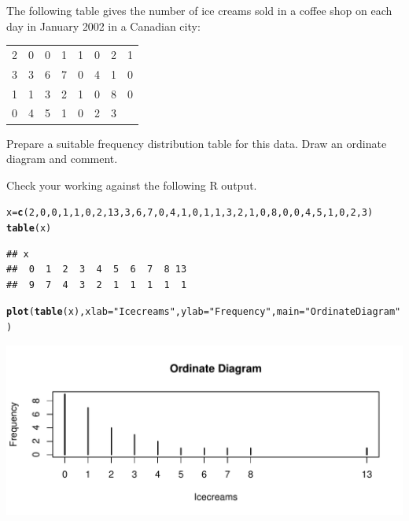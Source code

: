 \documentclass[bigtut]{tutorial}\usepackage[]{graphicx}\usepackage[]{color}
\makeatletter
\def\maxwidth{ %
  \ifdim\Gin@nat@width>\linewidth
    \linewidth
  \else
    \Gin@nat@width
  \fi
}
\newcommand{\hlnum}[1]{\textcolor[rgb]{0.686,0.059,0.569}{#1}}%
\newcommand{\hlstr}[1]{\textcolor[rgb]{0.192,0.494,0.8}{#1}}%
\newcommand{\hlstd}[1]{\textcolor[rgb]{0.345,0.345,0.345}{#1}}%
\newcommand{\hlkwb}[1]{\textcolor[rgb]{0.69,0.353,0.396}{#1}}%
\newcommand{\hlkwc}[1]{\textcolor[rgb]{0.333,0.667,0.333}{#1}}%
\newcommand{\hlkwd}[1]{\textcolor[rgb]{0.737,0.353,0.396}{\textbf{#1}}}%
\newenvironment{kframe}{%
 \def\at@end@of@kframe{}%
 \ifinner\ifhmode%
  \def\at@end@of@kframe{\end{minipage}}%
  \begin{minipage}{\columnwidth}%
 \fi\fi%
 \def\FrameCommand##1{\hskip\@totalleftmargin \hskip-\fboxsep
 \colorbox{shadecolor}{##1}\hskip-\fboxsep
     \hskip-\linewidth \hskip-\@totalleftmargin \hskip\columnwidth}%
 \MakeFramed {\advance\hsize-\width
   \@totalleftmargin\z@ \linewidth\hsize
   \@setminipage}}%
 {\par\unskip\endMakeFramed%
 \at@end@of@kframe}
\newenvironment{knitrout}{}{} %
\makeatother
\begin{document}
\begin{tutorial}
\begin{questions}
The following table gives the number of ice creams sold in a coffee shop
on each day in January 2002 in a Canadian city:
\begin{center}
 \begin{tabular}{llllllll}
   2&0&0&1&1&0&2&1\\
 3&3&6&7&0&4&1&0\\
1&1&3&2&1&0&8&0\\
  0&4&5&1&0&2&3&
 \end{tabular}
\end{center}

Prepare a suitable frequency distribution table for this data. Draw an ordinate
diagram and comment.


\begin{solution}

Check your working against the following R output.
\begin{knitrout}
\color{fgcolor}\begin{kframe}
\begin{alltt}
\hlstd{x}\hlkwb{=}\hlkwd{c}\hlstd{(}\hlnum{2}\hlstd{,}\hlnum{0}\hlstd{,}\hlnum{0}\hlstd{,}\hlnum{1}\hlstd{,}\hlnum{1}\hlstd{,}\hlnum{0}\hlstd{,}\hlnum{2}\hlstd{,}\hlnum{13}\hlstd{,}\hlnum{3}\hlstd{,}\hlnum{6}\hlstd{,}\hlnum{7}\hlstd{,}\hlnum{0}\hlstd{,}\hlnum{4}\hlstd{,}\hlnum{1}\hlstd{,}\hlnum{0}\hlstd{,}\hlnum{1}\hlstd{,}\hlnum{1}\hlstd{,}\hlnum{3}\hlstd{,}\hlnum{2}\hlstd{,}\hlnum{1}\hlstd{,}\hlnum{0}\hlstd{,}\hlnum{8}\hlstd{,}\hlnum{0}\hlstd{,}\hlnum{0}\hlstd{,}\hlnum{4}\hlstd{,}\hlnum{5}\hlstd{,}\hlnum{1}\hlstd{,}\hlnum{0}\hlstd{,}\hlnum{2}\hlstd{,}\hlnum{3}\hlstd{)}
\hlkwd{table}\hlstd{(x)}
\end{alltt}
\begin{verbatim}
## x
##  0  1  2  3  4  5  6  7  8 13 
##  9  7  4  3  2  1  1  1  1  1
\end{verbatim}
\begin{alltt}
\hlkwd{plot}\hlstd{(}\hlkwd{table}\hlstd{(x),}\hlkwc{xlab}\hlstd{=}\hlstr{"Icecreams"}\hlstd{,} \hlkwc{ylab}\hlstd{=}\hlstr{"Frequency"}\hlstd{,}\hlkwc{main}\hlstd{=}\hlstr{"Ordinate Diagram"}\hlstd{)}
\end{alltt}
\end{kframe}
\includegraphics[width=\maxwidth]{figure/unnamed-chunk-17-1} 


\end{knitrout}
\end{solution}
\end{questions}
\end{tutorial}
\end{document}
